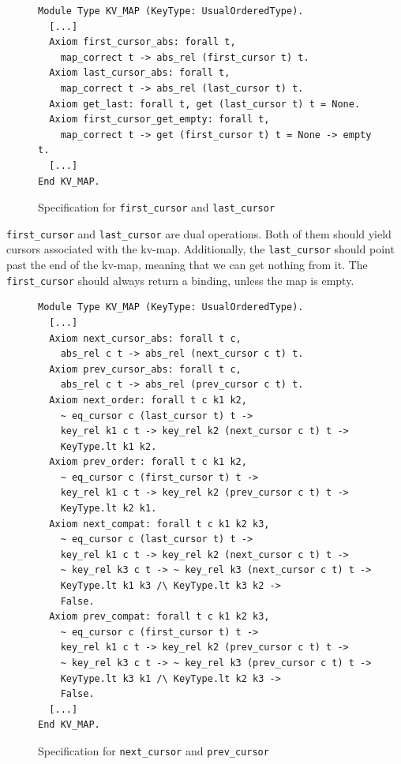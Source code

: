 \documentclass[runningheads]{llncs}
\begin{document}
\begin{figure}[htbp]
  \centering
  \begin{verbatim}
Module Type KV_MAP (KeyType: UsualOrderedType).
  [...]
  Axiom first_cursor_abs: forall t,
    map_correct t -> abs_rel (first_cursor t) t.
  Axiom last_cursor_abs: forall t,
    map_correct t -> abs_rel (last_cursor t) t.
  Axiom get_last: forall t, get (last_cursor t) t = None.
  Axiom first_cursor_get_empty: forall t,
    map_correct t -> get (first_cursor t) t = None -> empty t.
  [...]
End KV_MAP.
\end{verbatim}
  \caption{Specification for \texttt{first\_cursor} and \texttt{last\_cursor}}\label{fig:first_last}
\end{figure}

\texttt{first\_cursor} and \texttt{last\_cursor} are dual operations. Both of
them should yield cursors associated with the kv-map. Additionally, the
\texttt{last\_cursor} should point past the end of the kv-map, meaning that we
can get nothing from it. The \texttt{first\_cursor} should always return a
binding, unless the map is empty.

\begin{figure}[htbp]
  \centering
  \begin{verbatim}
Module Type KV_MAP (KeyType: UsualOrderedType).
  [...]
  Axiom next_cursor_abs: forall t c,
    abs_rel c t -> abs_rel (next_cursor c t) t.
  Axiom prev_cursor_abs: forall t c,
    abs_rel c t -> abs_rel (prev_cursor c t) t.
  Axiom next_order: forall t c k1 k2,
    ~ eq_cursor c (last_cursor t) t ->
    key_rel k1 c t -> key_rel k2 (next_cursor c t) t ->
    KeyType.lt k1 k2.
  Axiom prev_order: forall t c k1 k2,
    ~ eq_cursor c (first_cursor t) t ->
    key_rel k1 c t -> key_rel k2 (prev_cursor c t) t ->
    KeyType.lt k2 k1.
  Axiom next_compat: forall t c k1 k2 k3,
    ~ eq_cursor c (last_cursor t) t ->
    key_rel k1 c t -> key_rel k2 (next_cursor c t) t ->
    ~ key_rel k3 c t -> ~ key_rel k3 (next_cursor c t) t ->
    KeyType.lt k1 k3 /\ KeyType.lt k3 k2 ->
    False.
  Axiom prev_compat: forall t c k1 k2 k3,
    ~ eq_cursor c (first_cursor t) t ->
    key_rel k1 c t -> key_rel k2 (prev_cursor c t) t ->
    ~ key_rel k3 c t -> ~ key_rel k3 (prev_cursor c t) t ->
    KeyType.lt k3 k1 /\ KeyType.lt k2 k3 ->
    False.
  [...]
End KV_MAP.
\end{verbatim}
  \caption{Specification for \texttt{next\_cursor} and \texttt{prev\_cursor}}\label{fig:next_prev}
\end{figure}
\end{document}

